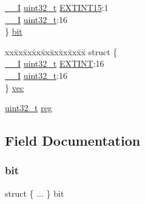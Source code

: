 \begin{DoxyCompactItemize}
\begin{tabbing}
\>\mbox{\hyperlink{core__cm0plus_8h_af63697ed9952cc71e1225efe205f6cd3}{\_\_I}} \mbox{\hyperlink{union_e_i_c___i_n_t_f_l_a_g___type_a7c2ec0f7b3f1314bdede58b182af397c}{uint32\_t}} \mbox{\hyperlink{union_e_i_c___i_n_t_f_l_a_g___type_a2221db2c05ed3aa49a09fed0a7ba30df}{EXTINT15}}:1\\
\>\mbox{\hyperlink{core__cm0plus_8h_af63697ed9952cc71e1225efe205f6cd3}{\_\_I}} \mbox{\hyperlink{union_e_i_c___i_n_t_f_l_a_g___type_a7c2ec0f7b3f1314bdede58b182af397c}{uint32\_t}}:16\\
\} \mbox{\hyperlink{union_e_i_c___i_n_t_f_l_a_g___type_a2ea4a11ef475a0ccb78c961916d888e3}{bit}}\\

\end{tabbing}\item 
\begin{tabbing}
xx\=xx\=xx\=xx\=xx\=xx\=xx\=xx\=xx\=\kill
struct \{\\
\>\mbox{\hyperlink{core__cm0plus_8h_af63697ed9952cc71e1225efe205f6cd3}{\_\_I}} \mbox{\hyperlink{union_e_i_c___i_n_t_f_l_a_g___type_a7c2ec0f7b3f1314bdede58b182af397c}{uint32\_t}} \mbox{\hyperlink{union_e_i_c___i_n_t_f_l_a_g___type_a43e7c7d1973bba086c1d04de066b1152}{EXTINT}}:16\\
\>\mbox{\hyperlink{core__cm0plus_8h_af63697ed9952cc71e1225efe205f6cd3}{\_\_I}} \mbox{\hyperlink{union_e_i_c___i_n_t_f_l_a_g___type_a7c2ec0f7b3f1314bdede58b182af397c}{uint32\_t}}:16\\
\} \mbox{\hyperlink{union_e_i_c___i_n_t_f_l_a_g___type_afaafd5555565b86c40068aaacedab22b}{vec}}\\

\end{tabbing}\item 
\mbox{\hyperlink{union_e_i_c___i_n_t_f_l_a_g___type_a7c2ec0f7b3f1314bdede58b182af397c}{uint32\+\_\+t}} \mbox{\hyperlink{union_e_i_c___i_n_t_f_l_a_g___type_a6b91636401516a477989a336376d7b40}{reg}}
\end{DoxyCompactItemize}


\subsection{Field Documentation}
\mbox{\label{union_e_i_c___i_n_t_f_l_a_g___type_a2ea4a11ef475a0ccb78c961916d888e3}} 
\subsubsection{\texorpdfstring{bit}{bit}}
{\footnotesize\ttfamily struct \{ ... \}   bit}

